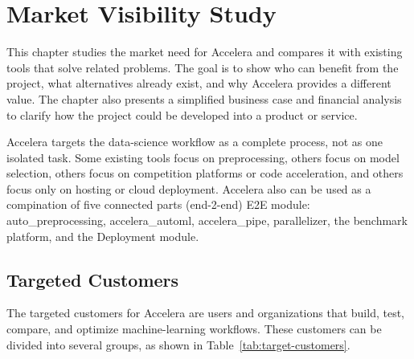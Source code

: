 \documentclass[12pt,a4paper]{report}
\begin{document}
\chapter{Market Visibility Study}
\label{chap:market-visibility}

This chapter studies the market need for Accelera and compares it with existing
tools that solve related problems. The goal is to show who can benefit from the
project, what alternatives already exist, and why Accelera provides a different
value. The chapter also presents a simplified business case and financial
analysis to clarify how the project could be developed into a product or service.

\medskip
\noindent Accelera targets the data-science workflow as a complete process, not as one
isolated task. Some existing tools focus on preprocessing, others focus on model
selection, others focus on competition platforms or code acceleration, and
others focus only on hosting or cloud deployment.
Accelera also can be used as a compination of five connected parts (end-2-end) E2E module:
auto\_preprocessing, accelera\_automl,
accelera\_pipe, parallelizer, the benchmark platform, and
the Deployment module.

\section{Targeted Customers}

\medskip
\noindent The targeted customers for Accelera are users and organizations that build,
test, compare, and optimize machine-learning workflows. These customers can be
divided into several groups, as shown in Table~\ref{tab:target-customers}.
\end{document}
